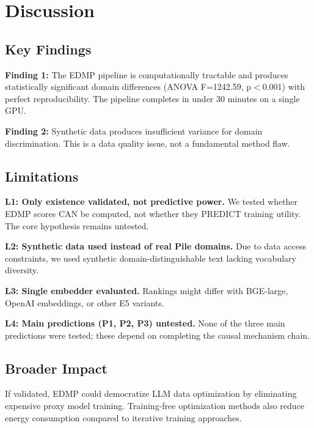 \section{Discussion}
\label{sec:discussion}

\subsection{Key Findings}

\textbf{Finding 1:} The EDMP pipeline is computationally tractable and produces statistically significant domain differences (ANOVA F=1242.59, p$<$0.001) with perfect reproducibility. The pipeline completes in under 30 minutes on a single GPU.

\textbf{Finding 2:} Synthetic data produces insufficient variance for domain discrimination. This is a data quality issue, not a fundamental method flaw.

\subsection{Limitations}

\textbf{L1: Only existence validated, not predictive power.} We tested whether EDMP scores CAN be computed, not whether they PREDICT training utility. The core hypothesis remains untested.

\textbf{L2: Synthetic data used instead of real Pile domains.} Due to data access constraints, we used synthetic domain-distinguishable text lacking vocabulary diversity.

\textbf{L3: Single embedder evaluated.} Rankings might differ with BGE-large, OpenAI embeddings, or other E5 variants.

\textbf{L4: Main predictions (P1, P2, P3) untested.} None of the three main predictions were tested; these depend on completing the causal mechanism chain.

\subsection{Broader Impact}

If validated, EDMP could democratize LLM data optimization by eliminating expensive proxy model training. Training-free optimization methods also reduce energy consumption compared to iterative training approaches.

